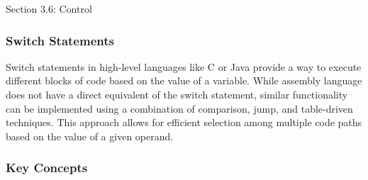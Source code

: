 \begin{notes}{Section 3.6: Control}
    \subsubsection*{Switch Statements}

    Switch statements in high-level languages like C or Java provide a way to execute different blocks of code based on the value of a variable. While assembly language does not have a direct equivalent 
    of the switch statement, similar functionality can be implemented using a combination of comparison, jump, and table-driven techniques. This approach allows for efficient selection among multiple 
    code paths based on the value of a given operand.
    
    \subsubsection*{Key Concepts}
    

\end{notes}
